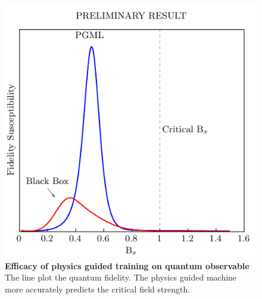\begin{figure}
	\includegraphics{figures/4-site-fidelity-susceptibility.pdf}
	\caption{\textbf{Efficacy of physics guided training on quantum observable} 
	The line plot the quantum fidelity. The physics guided machine more
	accurately predicts the critical field strength.}
	\label{4-site-fidelity-susceptibility}
\end{figure}
